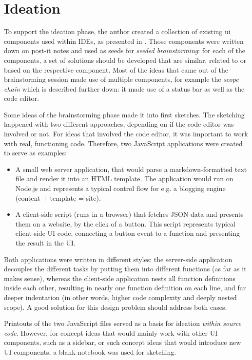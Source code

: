 \section{Ideation}\label{ideation}

To support the ideation phase, the author created a collection of
existing \ac{ui} components used within IDEs, as presented in
. Those components were written down on post-it notes
and used as seeds for \emph{seeded brainstorming}: for each of the
components, a set of solutions should be developed that are similar,
related to or based on the respective component. Most of the ideas that
came out of the brainstorming session made use of multiple components,
for example the \emph{scope chain} which is described further down: it
made use of a status bar as well as the code editor.

Some ideas of the brainstorming phase made it into first sketches. The
sketching happened with two different approaches, depending on if the
code editor was involved or not. For ideas that involved the code
editor, it was important to work with real, functioning code. Therefore,
two JavaScript applications were created to serve as examples:

\begin{itemize}
\itemsep1pt\parskip0pt
\item
  A small web server application, that would parse a markdown-formatted
  text file and render it into an HTML template. The application would
  run on Node.js and represents a typical control flow for e.g. a
  blogging engine (content + template = site).
\item
  A client-side script (runs in a browser) that fetches JSON data and
  presents them on a website, by the click of a button. This script
  represents typical client-side UI code, connecting a button event to a
  function and presenting the result in the UI.
\end{itemize}

Both applications were written in different styles: the server-side
application decouples the different tasks by putting them into different
functions (as far as it makes sense), whereas the client-side
application nests all function definitions inside each other, resulting
in nearly one function definition on each line, and far deeper
indentation (in other words, higher code complexity and deeply nested
scope). A good solution for this design problem should address both
cases.

Printouts of the two JavaScript files served as a basis for ideation
\emph{within source code}. However, for concept ideas that would mainly
work with other UI components, such as a sidebar, or such concept ideas
that would introduce new UI components, a blank notebook was used for
sketching.

